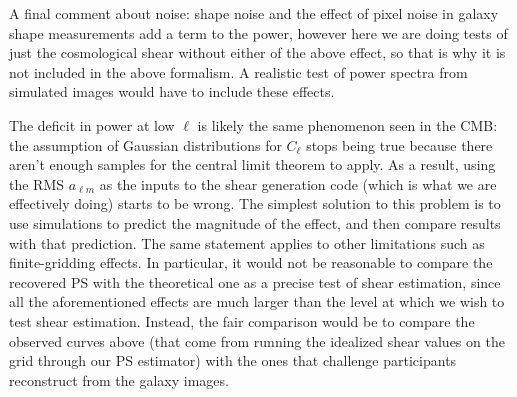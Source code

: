 \documentclass[preprint]{aastex}
\begin{document}
A final comment about noise: shape noise and the effect of pixel noise
in galaxy shape measurements add a term to the power, however here we
are doing tests of just the cosmological shear without either of the
above effect, so that is why it is not included in the above
formalism.  A realistic test of power spectra from simulated images
would have to include these effects.

The deficit in power at low $\ell$ is likely the same phenomenon  seen
in the CMB: the assumption of Gaussian distributions for $C_\ell$
stops being true because there aren't enough samples for the central
limit theorem to apply.  As a result, using the RMS $a_{\ell m}$ as
the inputs to the shear generation code (which is what we are
effectively doing) starts to be wrong.  The simplest solution to this
problem is to use simulations to predict the magnitude of the effect,
and then compare results with that prediction.  The same statement
applies to other limitations such as finite-gridding effects.  In
particular, it would not be reasonable to compare the recovered PS
with the theoretical one as a precise test of shear estimation, since
all the aforementioned effects are much larger than the level at which
we wish to test shear estimation.  Instead, the fair comparison would
be to compare the observed curves above (that come from running the
idealized shear values on the grid through our PS estimator) with the
ones that challenge participants reconstruct from the galaxy images.
\end{document}
